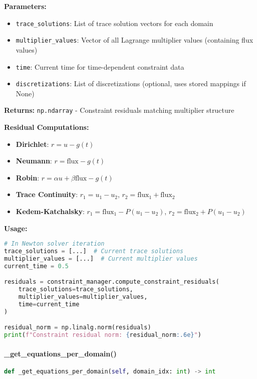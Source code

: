 \textbf{Parameters:}
\begin{itemize}
    \item \texttt{trace\_solutions}: List of trace solution vectors for each domain
    \item \texttt{multiplier\_values}: Vector of all Lagrange multiplier values (containing flux values)
    \item \texttt{time}: Current time for time-dependent constraint data
    \item \texttt{discretizations}: List of discretizations (optional, uses stored mappings if None)
\end{itemize}

\textbf{Returns:} \texttt{np.ndarray} - Constraint residuals matching multiplier structure

\textbf{Residual Computations:}
\begin{itemize}
    \item \textbf{Dirichlet}: $r = u - g(t)$
    \item \textbf{Neumann}: $r = \text{flux} - g(t)$
    \item \textbf{Robin}: $r = \alpha u + \beta \text{flux} - g(t)$
    \item \textbf{Trace Continuity}: $r_1 = u_1 - u_2$, $r_2 = \text{flux}_1 + \text{flux}_2$
    \item \textbf{Kedem-Katchalsky}: $r_1 = \text{flux}_1 - P(u_1-u_2)$, $r_2 = \text{flux}_2 + P(u_1-u_2)$
\end{itemize}

\textbf{Usage:}
\begin{lstlisting}[language=Python, caption=Compute Residuals Usage]
# In Newton solver iteration
trace_solutions = [...]  # Current trace solutions
multiplier_values = [...]  # Current multiplier values
current_time = 0.5

residuals = constraint_manager.compute_constraint_residuals(
    trace_solutions=trace_solutions,
    multiplier_values=multiplier_values,
    time=current_time
)

residual_norm = np.linalg.norm(residuals)
print(f"Constraint residual norm: {residual_norm:.6e}")
\end{lstlisting}

\paragraph{\_get\_equations\_per\_domain()}\leavevmode
\begin{lstlisting}[language=Python, caption=Get Equations per Domain Helper Method]
def _get_equations_per_domain(self, domain_idx: int) -> int
\end{lstlisting}

